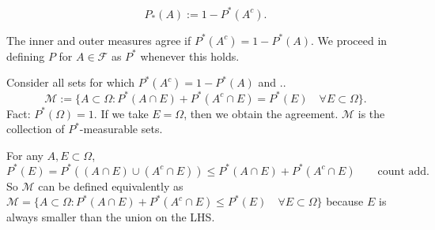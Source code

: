 \documentclass[class=article,crop=false]{standalone}
\begin{document}
\begin{defn}
\[
	P_*(A) := 1 - P^* (A^{c})
.\] 
\end{defn}

\begin{note}[]
	The inner and outer measures agree if $P^*(A^{c})=1-P^* (A)$. We proceed in defining $P$ for  $A \in \mathcal{F}$ as $P^* $ whenever this holds.
\end{note}

Consider all sets for which $P^* (A^{c})=1-P^* (A)$ and ..
\[
	\mathcal{M} := \{A \subset  \Omega: P^* (A \cap E) + P^* (A^{c} \cap E) = P^* (E) \quad \forall  E \subset  \Omega\}
.\] 
Fact: $P^* (\Omega) = 1$.
If we take $E=\Omega$, then we obtain the agreement. $\mathcal{M}$ is the collection of $P^* $-measurable sets.

\begin{note}[]
For any $A,E \subset \Omega$, 
\[
	P^* (E) = P^* ((A \cap E) \cup (A^{c} \cap E))
	\leq P^* (A \cap E) + P^* (A^{c} \cap E) \qquad \text{count add} 
.\] 
So $\mathcal{M}$ can be defined equivalently as $\mathcal{M}=\{A \subset \Omega: P^* (A \cap E) + P^* (A^{c} \cap E) \leq P^*(E) \quad \forall  E \subset  \Omega\}$ because $E$ is always smaller than the union on the LHS.
\end{note}
\end{document}
